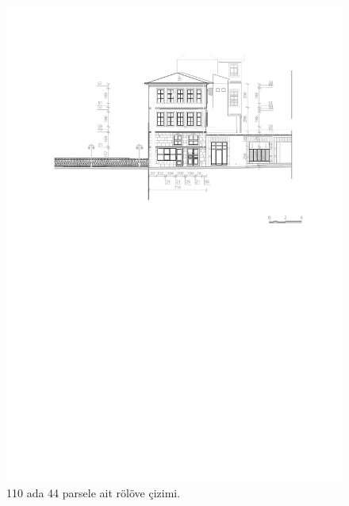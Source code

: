 \begin{figure}
\centering
\includegraphics[width=1\textwidth,height=\textheight]{source/figures/Roloveler/R110-44.pdf}
\caption{110 ada 44 parsele ait rölöve çizimi.}
\end{figure}

